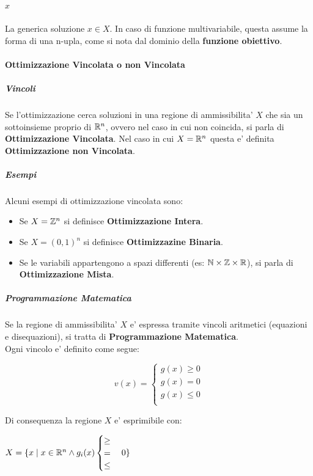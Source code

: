 \subparagraph{$x$}

La generica soluzione $x \in X$. In caso di funzione multivariabile, questa assume la forma di una n-upla, come si nota dal dominio della \textbf{funzione obiettivo}.

\paragraph{Ottimizzazione Vincolata o non Vincolata}

\subparagraph{Vincoli}

Se l'ottimizzazione cerca soluzioni in una regione di ammissibilita' $X$ che sia un sottoinsieme proprio di $\mathbb{R}^n$, ovvero nel caso in cui non coincida, si parla di \textbf{Ottimizzazione Vincolata}.
Nel caso in cui $X = \mathbb{R}^n$ questa e' definita \textbf{Ottimizzazione non Vincolata}.

\subparagraph{Esempi}
Alcuni esempi di ottimizzazione vincolata sono:

\begin{itemize}
    \item Se $X = \mathbb{Z}^n$ si definisce \textbf{Ottimizzazione Intera}.
    \item Se $X = (0,1)^n$ si definisce \textbf{Ottimizzazine Binaria}.
    \item Se le variabili appartengono a spazi differenti (es: $\mathbb{N} \times \mathbb{Z} \times \mathbb{R}$), si parla di \textbf{Ottimizzazione Mista}.
\end{itemize}

\subparagraph{Programmazione Matematica}

Se la regione di ammissibilita' $X$ e' espressa tramite vincoli aritmetici (equazioni e disequazioni), si tratta di \textbf{Programmazione Matematica}. \\

Ogni vincolo e' definito come segue:

\[
    v(x) =
    \begin{cases}
        \text{$g(x) \geq 0$} \\
        \text{$g(x) = 0$} \\
        \text{$g(x) \leq 0$} \\
    \end{cases}
\]

Di consequenza la regione $X$ e' esprimibile con:

$X = \{ x \mid x \in \mathbb{R}^n \land g_i(x) \begin{cases} \geq \\ = \\ \leq \end{cases} 0\}$

